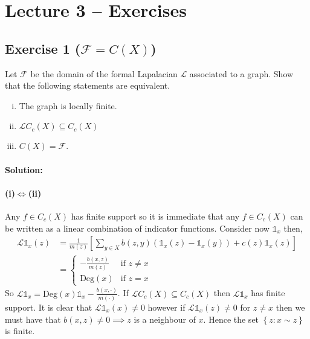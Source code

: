 \section{Lecture 3 -- Exercises}

\subsection{Exercise 1 (\texorpdfstring{$\mathcal{F}=C(X)$}))}

Let $\mathcal{F}$ be the domain of the formal Lapalacian $\mathcal{L}$ associated to a graph. Show that the following statements are equivalent.
\begin{enumerate}[(i)]
	\item 
		The graph is locally finite.
	\item 
		$\mathcal{L}C_{c}(X)\subseteq C_{c}(X)$
	\item 
		$C(X) = \mathcal{F}$.
\end{enumerate}

\paragraph{Solution:}
\paragraph{(i)$\iff$(ii)}
Any $f\in C_{c}(X)$ has finite support so it is immediate that any $f\in C_{c}(X)$ can be written as a linear combination of indicator functions. Consider now $\mathds{1}_{x}$ then,
\begin{equation*}
	\begin{aligned}
		\mathcal{L}\mathds{1}_{x}(z) &= \frac{1}{m(z)}\left[\sum_{y\in X}b(z,y)(\mathds{1}_{x}(z) - \mathds{1}_{x}(y)) + c(z)\mathds{1}_{x}(z)\right]\\
		&=
		\begin{cases}
			-\frac{b(x,z)}{m(z)}& \text{if }z\neq x\\
			\text{Deg}(x)& \text{if }z=x
		\end{cases}
	\end{aligned}
\end{equation*}
So $\mathcal{L}\mathds{1}_{x} = \text{Deg}(x)\mathds{1}_{x} - \frac{b(x,\cdot)}{m(\cdot)}$. If $\mathcal{L}C_{c}(X)\subseteq C_{c}(X)$ then $\mathcal{L}\mathds{1}_{x}$ has finite support. It is clear that $\mathcal{L}\mathds{1}_{x}(x)\neq 0$ however if $\mathcal{L}\mathds{1}_{x}(z)\neq 0$ for $z\neq x$ then we must have that $b(x,z)\neq 0\implies z$ is a neighbour of $x$. Hence the set $\left\{z\colon x\sim z\right\}$ is finite.

